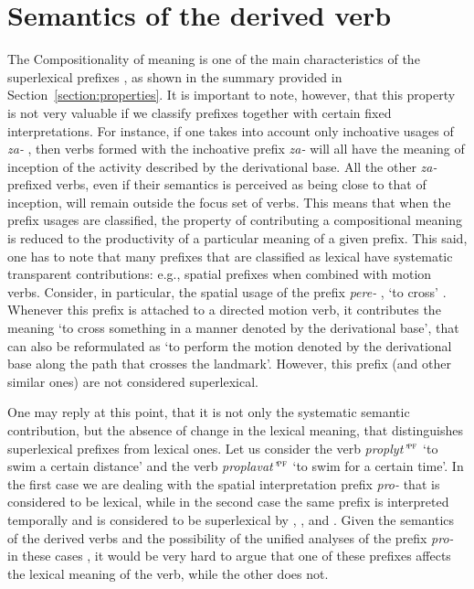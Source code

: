 \section{Semantics of the derived verb}\label{section:new:compositionality}
The Compositionality of meaning is one of the main characteristics of the superlexical prefixes , as shown in the summary provided in Section~\ref{section:properties}. It is important to note, however, that this property is not very valuable if we classify prefixes together with certain fixed interpretations. For instance, if one takes into account only inchoative  usages of \textit{za-} , then verbs formed with the inchoative  prefix \textit{za-}   will all have the meaning of inception of the activity described by the derivational base. All the other \textit{za-}  prefixed verbs, even if their semantics is perceived as being close to that of inception, will remain outside the focus set of verbs. This means that when the prefix usages are classified, the property of contributing a compositional meaning is reduced to the productivity of a particular meaning of a given prefix. This said, one has to note that many prefixes that are classified as lexical have systematic transparent contributions: e.g., spatial  prefixes when combined with motion verbs. Consider, in particular, the spatial  usage of the prefix \textit{pere-} , `to cross' . Whenever this prefix is attached to a directed motion verb, it contributes the meaning `to cross something in a manner denoted by the derivational base', that can also be reformulated as `to perform the motion denoted by the derivational base along the path that crosses the landmark'. However, this prefix (and other similar ones) are not considered superlexical.

One may reply at this point, that it is not only the systematic semantic contribution, but the absence of change in the lexical meaning, that distinguishes superlexical prefixes  from lexical ones. Let us consider the verb \textit{proplyt'}$^{\textsc{pf}}$ `to swim a certain distance' and the verb \textit{proplavat'}$^{\textsc{pf}}$ `to swim for a certain time'. In the first case we are dealing with the spatial  interpretation prefix \textit{pro-}   that is considered to be lexical, while in the second case the same prefix is interpreted temporally and is considered to be superlexical by \citet{Babko-Malaya:99}, \citet{Svenonius:04a}, and \citet{Svenonius:12}. Given the semantics of the derived verbs and the possibility of the unified analyses of the prefix \textit{pro-}   in these cases \citep{Kagan:book, ZinovaOsswald:paper}, it would be very hard to argue that one of these prefixes affects the lexical meaning of the verb, while the other does not. 

